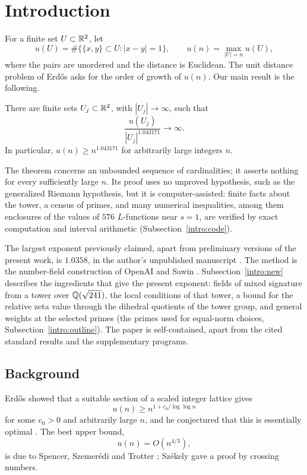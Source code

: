 \section{Introduction}\label{intro:section}
For a finite set $U\subset\mathbb R^2$, let
\[
 u(U)=\#\{\{x,y\}\subset U:|x-y|=1\},\qquad
 u(n)=\max_{|U|=n}u(U),
\]
where the pairs are unordered and the distance is Euclidean. The unit
distance problem of Erd\H{o}s \cite{Erdos1946} asks for the order of
growth of $u(n)$. Our main result is the following.

\begin{theorem}\label{thm:main}
There are finite sets $U_j\subset\mathbb R^2$, with $|U_j|\to\infty$, such that
\[
 \frac{u(U_j)}{|U_j|^{1.043171}}\longrightarrow\infty.
\]
In particular, $u(n)\ge n^{1.043171}$ for arbitrarily large integers $n$.
\end{theorem}

The theorem concerns an unbounded sequence of cardinalities; it asserts
nothing for every sufficiently large $n$. Its proof uses no unproved
hypothesis, such as the generalized Riemann hypothesis, but it is
computer-assisted: finite facts about the tower, a census of primes, and
many numerical inequalities, among them enclosures of the values of $576$
$L$-functions near $s=1$, are verified by exact computation and interval
arithmetic (Subsection~\ref{intro:code}).

The largest exponent previously claimed, apart from preliminary versions
of the present work, is $1.0358$, in the author's unpublished manuscript
\cite{Naslund0358}. The method is the number-field
construction of OpenAI \cite{OpenAI2026} and Sawin \cite{Sawin2026}.
Subsection~\ref{intro:new} describes the ingredients that give the
present exponent: fields of mixed signature from a tower over
$\mathbb Q(\sqrt{241})$, the local conditions of that tower, a bound for the
relative zeta value through the dihedral quotients of the tower group, and
general weights at the selected primes (the primes used
for equal-norm choices, Subsection~\ref{intro:outline}). The paper is
self-contained, apart from the cited standard results and the
supplementary programs.

\subsection{Background}\label{intro:background}
Erd\H{o}s \cite{Erdos1946} showed that a suitable section of a scaled
integer lattice gives
\[
 u(n)\ge n^{1+c_0/\log\log n}
\]
for some $c_0>0$ and arbitrarily large $n$, and he conjectured that this is
essentially optimal \cite{Erdos1946,Erdos1994}. The best upper bound,
\[
 u(n)=O(n^{4/3}),
\]
is due to Spencer, Szemer\'edi and Trotter
\cite{SpencerSzemerediTrotter1984}; Sz\'ekely \cite{Szekely1997} gave a
proof by crossing numbers.

